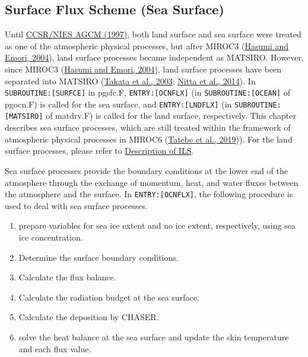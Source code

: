 \hypertarget{surface-flux-scheme-sea-surface}{%
\subsection{Surface Flux Scheme (Sea
Surface)}\label{surface-flux-scheme-sea-surface}}

Until
\href{https://github.com/MIROC-DOC/model_description/blob/master/org/AGCM5.6-Tech.pdf}{CCSR/NIES
AGCM (1997)}, both land surface and sea surface were treated as one of
the atmospheric physical processes, but after MIROC3
(\href{https://ccsr.aori.u-tokyo.ac.jp/~hasumi/miroc_description.pdf}{Hasumi
and Emori, 2004}), land surface processes became independent as MATSIRO.
However, since MIROC3
(\href{https://ccsr.aori.u-tokyo.ac.jp/~hasumi/miroc_description.pdf}{Hasumi
and Emori, 2004}), land surface processes have been separated into
MATSIRO
(\href{https://www.sciencedirect.com/science/article/pii/S0921818103000304}{Takata
et al., 2003};
\href{https://journals.ametsoc.org/doi/pdf/10.1175/JCLI-D-13-00310.1}{Nitta
et al., 2014}). In \texttt{SUBROUTINE:{[}SURFCE{]}} in pgsfc.F,
\texttt{ENTRY:{[}OCNFLX{]}} (in \texttt{SUBROUTINE:{[}OCEAN{]}} of
pgocn.F) is called for the sea surface, and \texttt{ENTRY:{[}LNDFLX{]}}
(in \texttt{SUBROUTINE:{[}MATSIRO{]}} of matdrv.F) is called for the
land surface, respectively. This chapter describes sea surface
processes, which are still treated within the framework of atmospheric
physical processes in MIROC6
(\href{https://www.geosci-model-dev.net/12/2727/2019/gmd-12-2727-2019.pdf}{Tatebe
et al., 2019})). For the land surface processes, please refer to
\href{https://github.com/integrated-land-simulator/model_description}{Description
of ILS}.

Sea surface processes provide the boundary conditions at the lower end
of the atmosphere through the exchange of momentum, heat, and water
fluxes between the atmosphere and the surface. In
\texttt{ENTRY:{[}OCNFLX{]}}, the following procedure is used to deal
with sea surface processes.

\begin{enumerate}
\def\labelenumi{\arabic{enumi}.}
\tightlist
\item
  prepare variables for sea ice extent and no ice extent, respectively,
  using sea ice concentration.
\item
  Determine the surface boundary conditions.
\item
  Calculate the flux balance.
\item
  Calculate the radiation budget at the sea surface.
\item
  Calculate the deposition by CHASER.
\item
  solve the heat balance at the sea surface and update the skin
  temperature and each flux value.
\end{enumerate}

